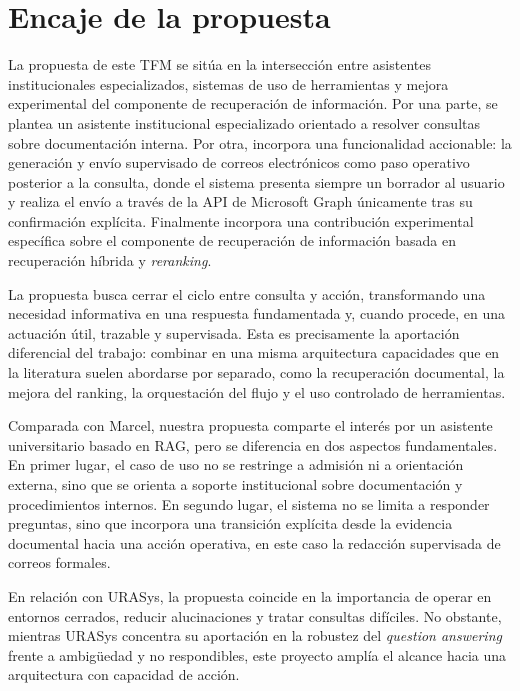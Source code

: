 \section{Encaje de la propuesta}

La propuesta de este TFM se sitúa en la intersección entre asistentes institucionales especializados, sistemas de uso de herramientas y mejora experimental del componente de recuperación de información. 
Por una parte, se plantea un asistente institucional especializado orientado a resolver consultas sobre documentación interna. 
Por otra, incorpora una funcionalidad accionable: la generación y envío supervisado de correos electrónicos como paso operativo posterior a la consulta, donde el sistema presenta siempre un borrador al usuario y realiza el envío a través de la API de Microsoft Graph únicamente tras su confirmación explícita. 
Finalmente incorpora una contribución experimental específica sobre el componente de recuperación de información basada en recuperación híbrida y \textit{reranking}.

La propuesta busca cerrar el ciclo entre consulta y acción, transformando una necesidad informativa en una respuesta fundamentada y, cuando procede, en una actuación útil, trazable y supervisada. Esta es precisamente la aportación diferencial del trabajo: combinar en una misma arquitectura capacidades que en la literatura suelen abordarse por separado, como la recuperación documental, la mejora del ranking, la orquestación del flujo y el uso controlado de herramientas.

Comparada con Marcel, nuestra propuesta comparte el interés por un asistente universitario basado en RAG, pero se diferencia en dos aspectos fundamentales. 
En primer lugar, el caso de uso no se restringe a admisión ni a orientación externa, sino que se orienta a soporte institucional sobre documentación y procedimientos internos. En segundo lugar, el sistema no se limita a responder preguntas, sino que incorpora una transición explícita desde la evidencia documental hacia una acción operativa, en este caso la redacción supervisada de correos formales.

En relación con URASys, la propuesta coincide en la importancia de operar en entornos cerrados, reducir alucinaciones y tratar consultas difíciles. 
No obstante, mientras URASys concentra su aportación en la robustez del \textit{question answering} frente a ambigüedad y no respondibles, este proyecto amplía el alcance hacia una arquitectura con capacidad de acción.

